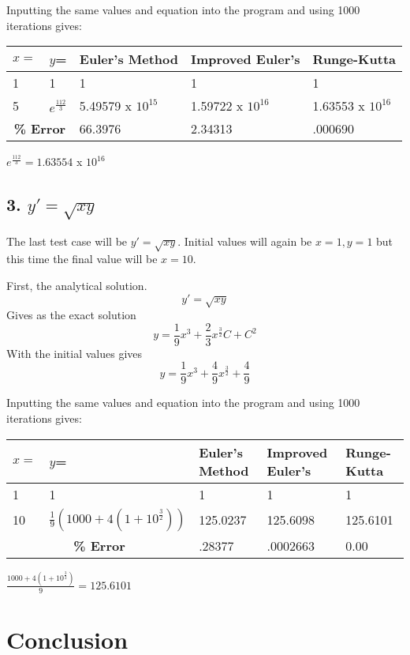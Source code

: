 \documentclass[12pt, letterpaper]{report}
\begin{document}
Inputting the same values and equation into the program and using 1000 iterations gives:

\begin{center}
\begin{tabular}{|l|l|l|l|l|}
    \hline
    \(x=\) & \(y\)= & Euler's Method & Improved Euler's & Runge-Kutta \\
    \hline
    1 & 1 & 1 & 1 & 1 \\
    \hline
    5 & \(e^{\frac{112}{3}}\) & 5.49579 x \(10^{15}\) & 1.59722 x \(10^{16}\) & 1.63553 x \(10^{16}\) \\
    \hline
    \multicolumn{2}{|c|}{\textbf{\% Error}} & 66.3976 & 2.34313 & .000690 \\
    \hline
\end{tabular}
\(e^{\frac{112}{3}}=1.63554\) x \(10^16\)
\end{center}


\subsection*{3. \(y'=\sqrt{xy}\)}
The last test case will be \(y'=\sqrt{xy}\). Initial values will again be \(x=1, y=1\) but this time the final value will be \(x=10\).

First, the analytical solution.\[y'=\sqrt{xy}\] Gives as the exact solution \[y=\frac{1}{9}x^3+\frac{2}{3}x^{\frac{3}{2}}C+C^2\]With the initial values gives \[y=\frac{1}{9}x^3+\frac{4}{9}x^{\frac{3}{2}}+\frac{4}{9}\]

Inputting the same values and equation into the program and using 1000 iterations gives:

\begin{center}
\begin{tabular}{|l|l|l|l|l|}
    \hline
    \(x=\) & \(y\)= & Euler's Method & Improved Euler's & Runge-Kutta \\
    \hline
    1 & 1 & 1 & 1 & 1 \\
    \hline
    10 & \(\frac{1}{9}(1000+4(1+10^{\frac{3}{2}}))\) & 125.0237 & 125.6098 & 125.6101 \\ [.5ex]
    \hline
    \multicolumn{2}{|c|}{\textbf{\% Error}} & .28377 & .0002663 & 0.00 \\
    \hline
\end{tabular}
\(\frac{1000+4(1+10^{\frac{3}{2}})}{9}=125.6101\)
\end{center}


\newpage
\section*{Conclusion}
\end{document}
